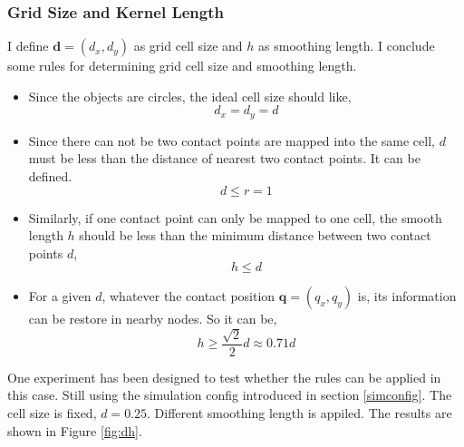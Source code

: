     \subsubsection{Grid Size and Kernel Length}
    I define $\pmb{d}=(d_x, d_y)$ as grid cell size and $h$ as smoothing length. I conclude some rules for determining grid cell size and smoothing length. 
    \begin{itemize}
        \item Since the objects are circles, the ideal cell size should like,
            $$d_x = d_y = d $$ 
        \item Since there can not be two contact points are mapped into the same cell, $d$ must be less than the distance of nearest two contact points. It can be defined.
            $$d \le r = 1$$
        \item Similarly, if one contact point can only be mapped to one cell, the smooth length $h$ should be less than the minimum distance between two contact points $d$,
            $$h \le d$$  
        \item For a given $d$, whatever the contact position $\pmb{q}=(q_x, q_y)$ is, its information can be restore in nearby nodes. So it can be,
            $$h \ge \frac{\sqrt{2}}{2}d \approx 0.71 d$$
    \end{itemize}
    One experiment has been designed to test whether the rules can be applied in this case. Still using the simulation config introduced in section \ref{simconfig}. The cell size is fixed, $d=0.25$. Different smoothing length is appiled. The results are shown in Figure \ref{fig:dh}.


